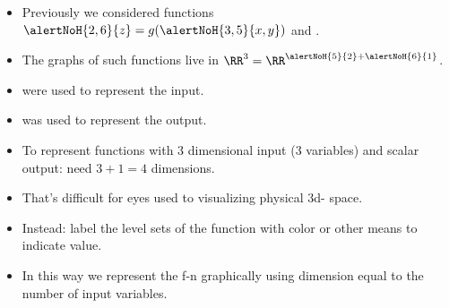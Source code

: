 \begin{frame}
\begin{itemize}
\item<1-> Previously we considered functions $\alertNoH{2,6}{z}= g(\alertNoH{3,5}{x,y})$   and .
\item<4-> The graphs of such functions live in $\RR^3 = \RR^{\alertNoH{5}{2} +\alertNoH{6}{1}}$.
\item<5->  were used to represent the input.
\item<6->  was used to represent the output.
\item<7-> To represent functions with 3 dimensional input (3 variables) and scalar output: need  $3+1=4$ dimensions.
\item<8-> That's difficult for eyes used to visualizing physical 3d- space.
\item<9-> Instead: label the level sets of the function with color or other means to indicate value.
\item<10-> In this way we represent the f-n graphically using dimension equal to the number of input variables.
\end{itemize}
\end{frame}
